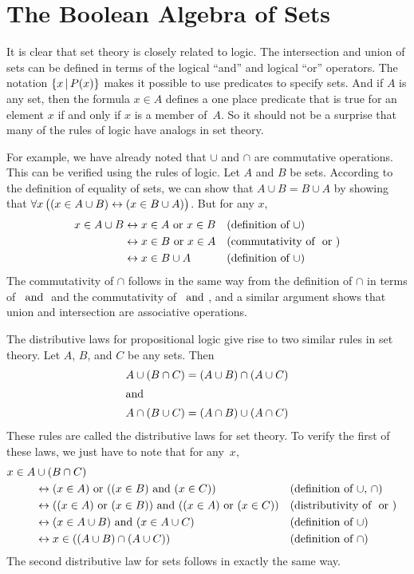\section{The Boolean Algebra of Sets}\label{S-sets-2}

It is clear that set theory is closely related to logic.
The intersection and union
of sets can be defined in terms of the logical ``and''
and logical ``or'' operators.
The notation $\{x\,|\, P(x)\}$ makes it possible to use predicates
to specify sets.  And if $A$ is any set, then the formula
$x\in A$ defines a one place predicate that is true for an element $x$
if and only if $x$ is a member of~$A$.  So it should not be a
surprise that many of the rules of logic have analogs in
set theory.

For example, we have already noted that $\cup$ and $\cap$ are
commutative operations.   This can be verified using the
rules of logic.  Let $A$ and $B$ be sets.  According to the definition 
of equality of sets, we can show that $A\cup B=B\cup A$ by showing
that $\forall x\,\big((x\in A\cup B)\leftrightarrow(x\in B\cup A)\big)$.
But for any $x$,
\begin{align*}
x\in A\cup B &\leftrightarrow x\in A \text{ or } x\in B  &&\text{(definition of $\cup$)}\\
             &\leftrightarrow x\in B \text{ or } x\in A  &&\text{(commutativity of $\text{ or }$)}\\
             &\leftrightarrow x\in B \cup A      &&\text{(definition of $\cup$)}
\end{align*}
The commutativity of $\cap$ follows in the same way from the
definition of $\cap$ in terms of~$\text{ and }$ and the commutativity of~$\text{ and }$,
and a similar argument shows that union and intersection are
associative operations.

The distributive laws for propositional logic give rise to two
similar rules in set theory.  Let $A$, $B$, and $C$ be any sets.
Then
\begin{align*}
A\cup(B\cap C)&=(A\cup B)\cap(A\cup C)\\
\intertext{and}
A\cap(B\cup C)&=(A\cap B)\cup(A\cap C)
\end{align*}
These rules are called the distributive laws for
set theory.  To verify the first of these laws, we just have to
note that for any~$x$,
\begin{align*}
x\in A&\cup(B\cap C) \\
                    &\leftrightarrow (x\in A)\text{ or }((x\in B)\text{ and } (x\in C))  
                              &&\text{(definition of $\cup$, $\cap$)}\\
                    &\leftrightarrow ((x\in A)\text{ or }(x\in B)) \text{ and }((x \in A)\text{ or } (x\in C))
                              &&\text{(distributivity of $\text{ or }$)}\\
                    &\leftrightarrow (x\in A\cup B) \text{ and } (x \in A\cup C)
                              &&\text{(definition of $\cup$)}\\
                    &\leftrightarrow x\in ((A\cup B)\cap(A\cup C))
                              &&\text{(definition of $\cap$)}
\end{align*}
The second distributive law for sets follows in exactly the
same way.

